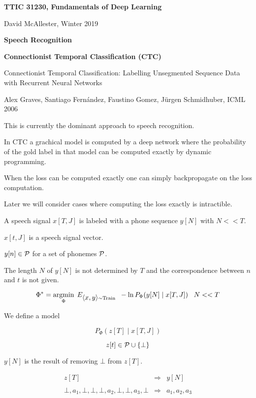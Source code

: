 




{\Huge

  \centerline{\bf TTIC 31230, Fundamentals of Deep Learning}
  \bigskip
  \centerline{David McAllester, Winter 2019}
  \vfill
  \centerline{\bf Speech Recognition}
  \vfill
  \centerline{\bf Connectionist Temporal Classification (CTC)}
\vfill
\vfill
\vfill


Connectionist Temporal Classification: Labelling Unsegmented
Sequence Data with Recurrent Neural Networks

\vfill
Alex Graves, Santiago Fern\'{a}ndez, Faustino Gomez, J\"{u}rgen Schmidhuber, ICML 2006

\vfill
This is currently the dominant approach to speech recognition.

In CTC a grachical model is computed by a deep network where the probability of the gold label in that model can be computed exactly by dynamic programming.

\vfill
When the loss can be computed exactly one can simply backpropagate on the loss computation.

\vfill
Later we will consider cases where computing the loss exactly is intractible.

A speech signal $x[T,J]$ is labeled with a phone sequence $y[N]$ with $N << T$.

\vfill
$x[t,J]$ is a speech signal vector.

\vfill
$y[n] \in {\cal P}$ for a set of phonemes ${\cal P}$.


\vfill
The length $N$ of $y[N]$ is not determined by $T$ and the correspondence between $n$ and $t$ is not given.

\vfill
{\color{red} $$\Phi^* = \operatorname*{argmin}_\Phi\;E_{{\mbox{$\langle x,y\rangle$}} \sim \mathrm{Train}}\;\;- \ln P_\Phi(y[N]\;|\;x[T,J]) \;\;\;N << T$$}




We define a model

$$P_\Phi(z[T]\;|\;x[T,J])$$

$$z[t] \in {\cal P} \cup \{\bot\}$$

\vfill
$y[N]$ is the result of removing $\bot$ from $z[T]$.

\begin{eqnarray*}
z[T] & \Rightarrow & y[N] \\
\\
\bot,a_1,\bot,\bot,\bot,a_2,\bot,\bot,a_3,\bot  & \Rightarrow & a_1,a_2,a_3
\end{eqnarray*}


}
